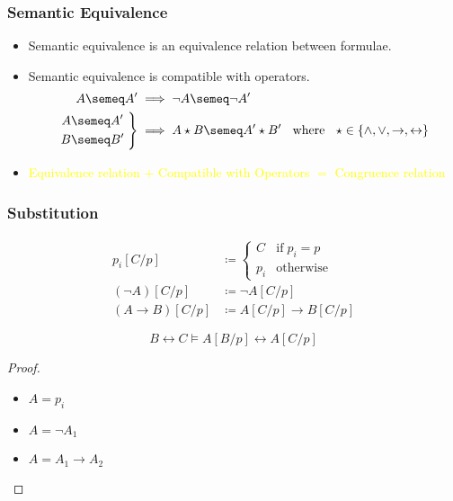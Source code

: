 \documentclass[UTF8,11pt,colorlinks,compress,openany]{beamer}%
\begin{document}
\begin{frame}\frametitle{Semantic Equivalence}
	\begin{itemize}
		\item Semantic equivalence is an equivalence relation between formulae.
		\item Semantic equivalence is compatible with operators.
\begin{align*}
A\semeq A'&\implies\neg A\semeq\neg A'\\
\left.
	\begin{aligned}
		A&\semeq A'\\
		B&\semeq B'
	\end{aligned}\;\right\}&\implies A\star B \semeq A'\star B' \;\;\mbox{ where }\;\; \star\in\{\wedge,\vee,\to,\leftrightarrow\}
\end{align*}
		\item \textcolor{yellow}{\small Equivalence relation $+$ Compatible with Operators $=$ Congruence relation}
	\end{itemize}
\end{frame}

\begin{frame}\frametitle{Substitution}
	\begin{align*}
		p_i[C/p]&\coloneqq
		\begin{cases}
			C &\mbox{if}\;p_i=p\\
			p_i &\mbox{otherwise}
		\end{cases}\\
		(\neg A)[C/p]&\coloneqq\neg A[C/p]\\
		(A\to B)[C/p]&\coloneqq A[C/p]\to B[C/p]
	\end{align*}
	\begin{theorem}
		\[B\leftrightarrow C \vDash A[B/p]\leftrightarrow A[C/p]\]
	\end{theorem}
	\begin{proof}
		\begin{itemize}
			\item $A=p_i$
			\item $A=\neg A_1$
			\item $A=A_1\to A_2$
		\end{itemize}
	\end{proof}
\end{frame}
\end{document}
